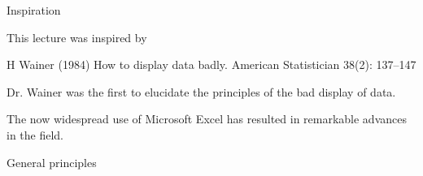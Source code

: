 \documentclass[12pt]{article}
\newcommand{\headsize}{\fontsize{35}{35} \selectfont}
\newcommand{\smallsize}{\fontsize{25}{30} \selectfont}
\newcommand{\smallersize}{\fontsize{20}{25} \selectfont}
\begin{document}
\newpage

\headsize \color{myyellow}
\hfill 
\begin{minipage}{5.75in}
\centering
Inspiration
\end{minipage}

\vspace{30mm}

\color{mywhite}
\smallsize

\hspace{0.5in} \begin{minipage}{9in}
This lecture was inspired by

\vspace{10mm}

\hfill \begin{minipage}{8.5in}
{\smallersize \color{myblue}
H Wainer (1984) How to display data badly. American Statistician
38(2): 137--147}
\end{minipage}

\vspace{20mm}

Dr. Wainer was the first to elucidate the principles of the bad
display of data.

\vspace{20mm}

The now widespread use of {\color{mypink} Microsoft Excel} has
resulted in remarkable advances in the field.
\end{minipage}

\newpage

\headsize \color{myyellow}
\hfill \begin{minipage}{5.75in}
\centering
General principles
\end{minipage}

\vspace{10mm}
\smallsize \color{mywhite}
\end{document}
